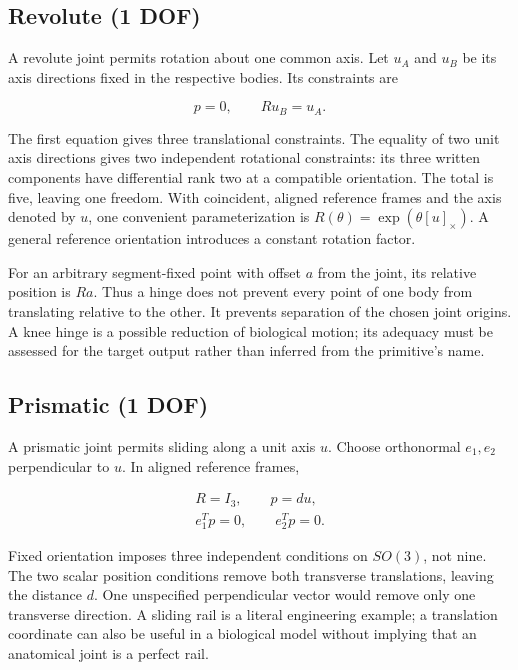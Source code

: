 \subsection{Revolute (1 DOF)}\label{revolute-1-dof}

A revolute joint permits rotation about one common axis. Let \(u_A\) and \(u_B\) be its axis directions fixed in the respective bodies. Its constraints are

\[
p=0,\qquad R u_B=u_A.
\]

The first equation gives three translational constraints. The equality of two unit axis directions gives two independent rotational constraints: its three written components have differential rank two at a compatible orientation. The total is five, leaving one freedom. With coincident, aligned reference frames and the axis denoted by \(u\), one convenient parameterization is \(R(\theta)=\exp(\theta[u]_\times)\). A general reference orientation introduces a constant rotation factor.

For an arbitrary segment-fixed point with offset \(a\) from the joint, its relative position is \(Ra\). Thus a hinge does not prevent every point of one body from translating relative to the other. It prevents separation of the chosen joint origins. A knee hinge is a possible reduction of biological motion; its adequacy must be assessed for the target output rather than inferred from the primitive's name.

\subsection{Prismatic (1 DOF)}\label{prismatic-1-dof}

A prismatic joint permits sliding along a unit axis \(u\). Choose orthonormal \(e_1,e_2\) perpendicular to \(u\). In aligned reference frames,

\[
\begin{gathered}R=I_3,\qquad p=d u,\\ e_1^T p=0,\qquad e_2^T p=0.\end{gathered}
\]

Fixed orientation imposes three independent conditions on \(SO(3)\), not nine. The two scalar position conditions remove both transverse translations, leaving the distance \(d\). One unspecified perpendicular vector would remove only one transverse direction. A sliding rail is a literal engineering example; a translation coordinate can also be useful in a biological model without implying that an anatomical joint is a perfect rail.

